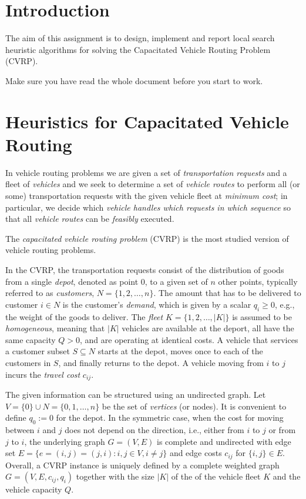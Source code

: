 

\section*{Introduction}

The aim of this assignment is to design, implement and report local
search heuristic algorithms for solving the Capacitated Vehicle Routing
Problem (CVRP).



\medskip
Make sure you have read the whole document before you start to work.


\section*{Heuristics for Capacitated Vehicle Routing}

In vehicle routing problems we are given a set of \emph{transportation
  requests} and a fleet of \emph{vehicles} and we seek to determine a
set of \emph{vehicle routes} to perform all (or some) transportation
requests with the given vehicle fleet at \emph{minimum cost}; in
particular, we decide which \emph{vehicle handles which requests in which
  sequence} so that all \emph{vehicle routes} can be \emph{feasibly}
executed.

The \emph{capacitated vehicle routing problem} (CVRP) is the most studied
version of vehicle routing problems.

In the CVRP, the transportation requests consist of the distribution of
goods from a single \emph{depot}, denoted as point $0$, to a given set
of $n$ other points, typically referred to as \emph{customers},
$N=\{1,2,\ldots,n\}$. The amount that has to be delivered to customer
$i\in N$ is the customer's \emph{demand}, which is given by a scalar
$q_i\geq 0 $, e.g., the weight of the goods to deliver. The \emph{fleet}
$K=\{1,2,\ldots,|K|\}$ is assumed to be \emph{homogeneous}, meaning that
$|K|$ vehicles are available at the deport, all have the same capacity
$Q>0$, and are operating at identical costs. A vehicle that services a
customer subset $S\subseteq N$ starts at the depot, moves once to each
of the customers in $S$, and finally returns to the depot. A vehicle
moving from $i$ to $j$ incurs the \emph{travel cost} $c_{ij}$.

The given information can be structured using an undirected graph. Let
$V=\{0\}\cup N=\{0,1,\ldots,n\}$ be the set of \emph{vertices} (or
nodes). It is convenient to define $q_0:=0$ for the depot. In the
symmetric case, when the cost
for moving between $i$ and $j$ does not depend on the direction, i.e.,
either from $i$ to $j$ or from $j$ to $i$, the underlying graph
$G=(V,E)$ is complete and undirected with edge set $E=\{e=(i,j)=(j,i) :
i,j\in V,i\neq j\}$ and edge costs $c_{ij}$ for $\{i,j\} \in E$.
Overall, a CVRP instance is uniquely defined by a complete weighted graph
$G=(V,E,c_{ij},q_i)$ together with the size $|K|$ of the of the vehicle
fleet $K$ and the vehicle capacity $Q$.

